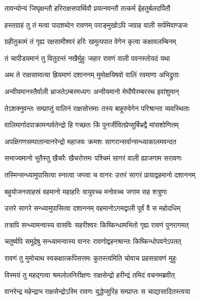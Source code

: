 \twolineshloka
{तावन्योन्यं जिघृक्षन्तौ हरिराक्षसपार्थिवौ}
{प्रयत्नवन्तौ तत्कर्म ईहतुर्बलदर्पितौ} %

\twolineshloka
{हस्तग्राहं तु तं मत्वा पादशब्देन रावणम्}
{पराङ्मुखोऽपि जग्राह वाली सर्पमिवाण्डजः} %

\twolineshloka
{ग्रहीतुकामं तं गृह्य रक्षसामीश्वरं हरिः}
{खमुत्पपात वेगेन कृत्वा कक्षावलम्बिनम्} %

\twolineshloka
{तं चापीडयमानं तु वितुदन्तं नखैर्मुहुः}
{जहार रावणं वाली पवनस्तोयदं यथा} %

\twolineshloka
{अथ ते राक्षसामात्या ह्रियमाणं दशाननम्}
{मुमोक्षयिषवो वालिं रवमाणा अभिद्रुताः} %

\twolineshloka
{अन्वीयमानस्तैर्वाली भ्राजतेऽम्बरमध्यगः}
{अन्वीयमानो मेघौघैरम्बरस्थ इवांशुमान्} %

\twolineshloka
{तेऽशक्नुवन्तः सम्प्राप्तुं वालिनं राक्षसोत्तमाः}
{तस्य बाहूरुवेगेन परिश्रान्ता व्यवस्थिताः} %

\twolineshloka
{वालिमार्गादपाक्रामन्पर्वतेन्द्रो हि गच्छतः}
{किं पुनर्जीवितप्रेप्सुर्बिभ्रद्वै मांसशोणितम्} %

\twolineshloka
{अपक्षिगणसम्पातान्वानरेन्द्रो महाजवः}
{क्रमशः सागरान्सर्वान्सन्ध्याकालमवन्दत} %

\twolineshloka
{सभाज्यमानो भूतैस्तु खैचरैः खैचरोत्तमः}
{पश्चिमं सागरं वाली ह्याजगाम सरावणः} %

\twolineshloka
{तस्मिन्सन्ध्यामुपासित्वा स्नात्वा जप्त्वा च वानरः}
{उत्तरं सागरं प्रायाद्वहमानो दशाननम्} %

\twolineshloka
{बहुयोजनसाहस्रं वहमानो महाहरिः}
{वायुवच्च मनोवच्च जगाम सह शत्रुणा} %

\twolineshloka
{उत्तरे सागरे सन्ध्यामुपासित्वा दशाननम्}
{वहमानोऽगमद्वाली पूर्वं वै स महोदधिम्} %

\twolineshloka
{तत्रापि सन्ध्यामन्वास्य वासविः सहरीश्वरः}
{किष्किन्धामभितो गृह्य रावणं पुनरागमत्} %

\twolineshloka
{चतुर्ष्वपि समुद्रेषु सन्ध्यामन्वास्य वानरः}
{रावणोद्वहनश्रान्तः किष्किन्धोपवनेऽपतत्} %

\twolineshloka
{रावणं तु मुमोचाथ स्वकक्षात्कपिसत्तमः}
{कुतस्त्वमिति चोवाच प्रहसन्रावणं मुहुः} %

\twolineshloka
{विस्मयं तु महद्गत्वा श्रमलोलनिरीक्षणः}
{राक्षसेन्द्रो हरीन्द्रं तमिदं वचनमब्रवीत्} %

\twolineshloka
{वानरेन्द्र महेन्द्राभ राक्षसेन्द्रोऽस्मि रावणः}
{युद्धेप्सुरिह सम्प्राप्तः स चाद्यासादितस्त्वया} %

